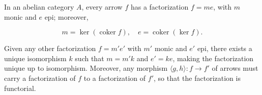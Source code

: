 In an abelian category $A$, every arrow $f$ has a factorization $f = me$, with $m$ monic and $e$ epi; moreover,

$$m = \ker (\operatorname{coker} f), \quad e = \operatorname{coker} (\ker f).$$

Given any other factorization $f = m'e'$ with $m'$ monic and $e'$ epi, there exists a unique isomorphism $k$ such that $m = m'k$ and $e' = ke$, making the factorization unique up to isomorphism. Moreover, any morphism $\langle g, h \rangle : f \rightarrow f'$ of arrows must carry a factorization of $f$ to a factorization of $f'$, so that the factorization is functorial.
